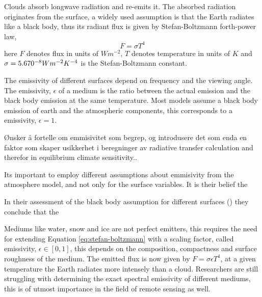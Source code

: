 Clouds absorb longwave radiation and re-emits it.
The absorbed radiation originates from the surface, a widely used assumption is that the Earth radiates like a black body, thus its radiant flux is given by Stefan-Boltzmann forth-power law, 
\begin{equation} \label{eq:stefan-boltzmann}
    F = \sigma  T ^4 %
\end{equation}
here $F$ denotes flux in units of $W m^{-2}$, $T$ denotes temperature in units of $K$ and $\sigma = 5.670 \time 10^{-8} W m^{-2} K^{-4}$ is the Stefan-Boltzmann constant. 

The emissivity of different surfaces depend on frequency and the viewing angle. The emissivity, $\epsilon$ of a medium is the ratio between the actual emission and the black body emission at the same temperature. Most models assume a black body emission of earth and the atmospheric components, this corresponds to a emissivity, $\epsilon=1$. 

Ønsker å fortelle om emmisivitet som begrep, og introdusere det som enda en faktor som skaper usikkerhet i beregninger av radiative transfer calculation and therefor in equilibrium climate sensitivity..

Its important to employ different assumptions about emmisivity from the atmosphere model, and not only for the surface variables. It is their belief the

In their assessment of the black body assumption for different surfaces (\cite{Huang2018ImprovedClimate}) they conclude that the



Mediums like water, snow and ice are not perfect emitters, this requires the need for extending Equation \eqref{eq:stefan-boltzmann} with a scaling factor, called emissivity, $\epsilon \in [0, 1]$, this depends on the composition, compactness and surface roughness of the medium. The emitted flux is now given by $ F = \sigma \epsilon T ^4$, at a given temperature the Earth radiates more intensely than a cloud. Researchers are still struggling with determining the exact spectral emissivity of different mediums, this is of utmost importance in the field of remote sensing as well.

